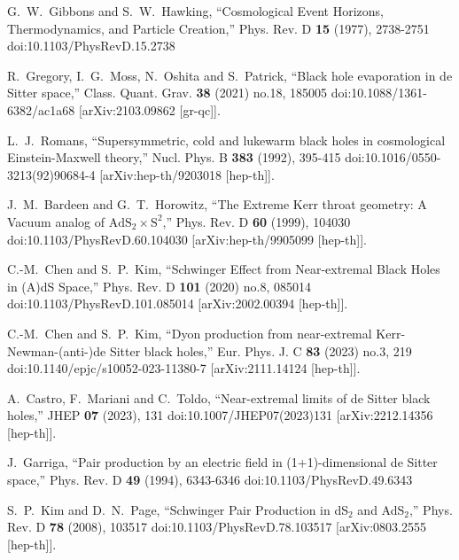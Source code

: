 \documentclass[aps,nofootinbib,superscriptaddress
]{revtex4}
\begin{document}
\begin{thebibliography}{99}

G.~W.~Gibbons and S.~W.~Hawking,
``Cosmological Event Horizons, Thermodynamics, and Particle Creation,''
Phys. Rev. D \textbf{15} (1977), 2738-2751
doi:10.1103/PhysRevD.15.2738

R.~Gregory, I.~G.~Moss, N.~Oshita and S.~Patrick,
``Black hole evaporation in de Sitter space,''
Class. Quant. Grav. \textbf{38} (2021) no.18, 185005
doi:10.1088/1361-6382/ac1a68
[arXiv:2103.09862 [gr-qc]].

L.~J.~Romans,
``Supersymmetric, cold and lukewarm black holes in cosmological Einstein-Maxwell theory,''
Nucl. Phys. B \textbf{383} (1992), 395-415
doi:10.1016/0550-3213(92)90684-4
[arXiv:hep-th/9203018 [hep-th]].

J.~M.~Bardeen and G.~T.~Horowitz,
``The Extreme Kerr throat geometry: A Vacuum analog of $\mathrm{AdS}_2 \times \mathrm{S}^2$,''
Phys. Rev. D \textbf{60} (1999), 104030
doi:10.1103/PhysRevD.60.104030
[arXiv:hep-th/9905099 [hep-th]].


C.-M.~Chen and S.~P.~Kim,
``Schwinger Effect from Near-extremal Black Holes in (A)dS Space,''
Phys. Rev. D \textbf{101} (2020) no.8, 085014
doi:10.1103/PhysRevD.101.085014
[arXiv:2002.00394 [hep-th]].

C.-M.~Chen and S.~P.~Kim,
``Dyon production from near-extremal Kerr-Newman-(anti-)de Sitter black holes,''
Eur. Phys. J. C \textbf{83} (2023) no.3, 219
doi:10.1140/epjc/s10052-023-11380-7
[arXiv:2111.14124 [hep-th]].


A.~Castro, F.~Mariani and C.~Toldo,
``Near-extremal limits of de Sitter black holes,''
JHEP \textbf{07} (2023), 131
doi:10.1007/JHEP07(2023)131
[arXiv:2212.14356 [hep-th]].

J.~Garriga,
``Pair production by an electric field in (1+1)-dimensional de Sitter space,''
Phys. Rev. D \textbf{49} (1994), 6343-6346
doi:10.1103/PhysRevD.49.6343

S.~P.~Kim and D.~N.~Page,
``Schwinger Pair Production in dS$_2$ and AdS$_2$,''
Phys. Rev. D \textbf{78} (2008), 103517
doi:10.1103/PhysRevD.78.103517
[arXiv:0803.2555 [hep-th]].


\end{thebibliography}
\end{document}
